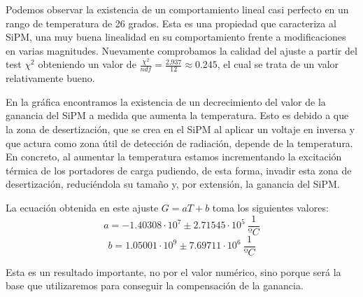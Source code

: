 \begin{itemize}
Podemos observar la existencia de un comportamiento lineal casi perfecto en un rango de temperatura de 26 grados. Esta es una propiedad que caracteriza al SiPM, una muy buena linealidad en su comportamiento frente a modificaciones en varias magnitudes. Nuevamente comprobamos la calidad del ajuste a partir del test $\chi^2$ obteniendo un valor de $\frac{\chi^2}{ndf}=\frac{2.937}{12}\approx 0.245$, el cual se trata de un valor relativamente bueno.

En la gráfica encontramos la existencia de un decrecimiento del valor de la ganancia del SiPM a medida que aumenta la temperatura. Esto es debido a que la zona de desertización, que se crea en el SiPM al aplicar un voltaje en inversa y que actura como zona útil de detección de radiación, depende de la temperatura. En concreto, al aumentar la temperatura estamos incrementando la excitación térmica de los portadores de carga pudiendo, de esta forma, invadir esta zona de desertización, reduciéndola su tamaño y, por extensión, la ganancia del SiPM.

La ecuación obtenida en este ajuste $G=aT+b$ toma los siguientes valores: 
\begin{equation}
a=-1.40308 \cdot 10^7 \pm 2.71545 \cdot 10^5~\frac{1}{ºC}
\label{ajustependientetemperatura}
\end{equation}
\begin{equation}
b=1.05001 \cdot 10^9 \pm 7.69711 \cdot 10^6 ~\frac{1}{ºC}
\label{ajusteordenadatemperatura}
\end{equation}


Esta es un resultado importante, no por el valor numérico, sino porque será la base que utilizaremos para conseguir la compensación de la ganancia.
\end{itemize}